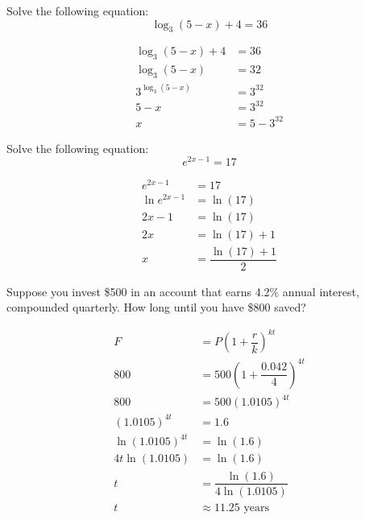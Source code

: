 \documentclass[11pt,letterpaper]{article}
\begin{document}
\newpage



 Solve the following equation:
	\[
	\log_3(5 - x) + 4= 36
	\] \pspace

\sol
	\[
	\begin{aligned}
	\log_3(5 - x) + 4&= 36 \\[0.3cm]
	\log_3(5 - x)&= 32 \\[0.3cm]
	3^{\log_3(5 - x)}&= 3^{32} \\[0.3cm]
	5 - x&= 3^{32} \\[0.3cm]
	x&= 5 - 3^{32}
	\end{aligned}
	\]



\newpage



 Solve the following equation: 
	\[
	e^{2x - 1}= 17
	\] \pspace

\sol
	\[
	\begin{aligned}
	e^{2x - 1}&= 17 \\[0.3cm]
	\ln e^{2x - 1}&= \ln(17) \\[0.3cm]
	2x - 1&= \ln(17) \\[0.3cm]
	2x&= \ln(17) + 1 \\[0.3cm]
	x&= \dfrac{\ln(17) + 1}{2}
	\end{aligned}
	\]



\newpage



 Suppose you invest \$500 in an account that earns 4.2\% annual interest, compounded quarterly. How long until you have \$800 saved? \pspace

\sol 
	\[
	\begin{aligned}
	F&= P \left(1 + \dfrac{r}{k} \right)^{kt} \\[0.3cm]
	800&= 500 \left(1 + \dfrac{0.042}{4} \right)^{4t} \\[0.3cm]
	800&= 500 (1.0105)^{4t} \\[0.3cm]
	(1.0105)^{4t}&= 1.6 \\[0.3cm]
	\ln(1.0105)^{4t}&= \ln(1.6) \\[0.3cm]
	4t \ln(1.0105)&= \ln(1.6) \\[0.3cm]
	t&= \dfrac{\ln(1.6)}{4\ln(1.0105)} \\[0.3cm]
	t&\approx 11.25 \text{ years}
	\end{aligned}
	\]



\newpage
\end{document}
